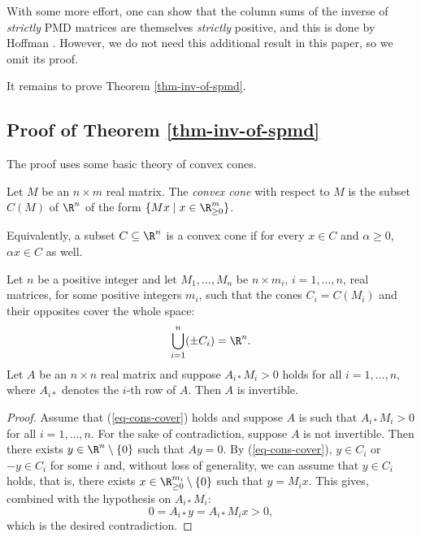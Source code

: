 \documentclass[11pt]{article}
\begin{document}
With some more effort, one can show that the column sums of the inverse of \emph{strictly} PMD matrices are themselves \emph{strictly} positive, and this is done by Hoffman \cite{hoffman1965nonsingularity}. However, we do not need this additional result in this paper, so we omit its proof. 

It remains to prove Theorem \ref{thm-inv-of-spmd}.

\subsection{Proof of Theorem \ref{thm-inv-of-spmd}}
    
The proof uses some basic theory of convex cones.

\begin{definition}\label{def-cone}
    Let $M$ be an $n\times m$ real matrix. The \emph{convex cone} with respect to $M$ is the subset $C(M)$ of $\R^n$ of the form $\{Mx\mid x\in\R_{\ge0}^m\}$.
\end{definition}

Equivalently, a subset $C\subseteq\R^n$ is a convex cone if for every $x\in C$ and $\alpha\ge 0$, $\alpha x\in C$ as well.

\begin{lemma}\label{le-inv-of-cons-cover}
    Let $n$ be a positive integer and let $M_1,\dots,M_n$ be $n\times m_i$, $i=1,\dots,n$, real matrices, for some positive integers $m_i$, such that the cones $C_i=C(M_i)$ and their opposites cover the whole space:
    \begin{equation}\label{eq-cons-cover}
        \bigcup_{i=1}^n (\pm C_i)=\R^n.
    \end{equation}
    Let $A$ be an $n\times n$ real matrix and suppose $A_{i*}M_i>0$ holds for all $i=1,\dots,n$, where $A_{i*}$ denotes the $i$-th row of $A$. Then $A$ is invertible.
    
\end{lemma}

\begin{proof}
    Assume that (\ref{eq-cons-cover}) holds and suppose $A$ is such that $A_{i*}M_i>0$ for all $i=1,\dots,n$. For the sake of contradiction, suppose $A$ is not invertible. Then there exists $y\in\R^n\setminus\{0\}$ such that $Ay=0$. By (\ref{eq-cons-cover}), $y\in C_i$ or $-y\in C_i$ for some $i$ and, without loss of generality, we can assume that $y\in C_i$ holds, that is, there exists $x\in\R_{\ge0}^{m_i}\setminus\{0\}$ such that $y=M_ix$. This gives, combined with the hypothesis on $A_{i*}M_i$:
    $$0=A_{i*}y=A_{i*}M_ix>0,$$
    which is the desired contradiction. 
\end{proof}
\end{document}
